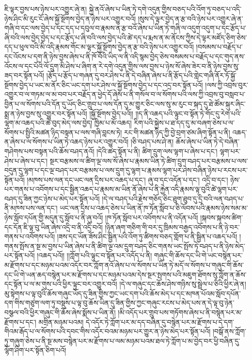 ཇི་ལྟར་བྱས་པས་ཉེས་པར་འགྱུར་ཞེ་ན། སྐྱེ་ནའོ་ཞེས་པ་ཡིན་ཏེ་དགེ་འདུན་གྱིས་བཅད་པའི་འོག་ཏུ་བཅད་པ་འདི་ཉེས་ཤིང་མི་རུང་ངོ་ཞེས་སྐྱོ་སྔོགས་བྱེད་ན་ཉེས་པར་འགྱུར་བའོ། །སུས་དེ་ལྟར་བྱེད་ན་རྩ་བའི་ཉེས་པར་འགྱུར་ཞེ་ན་གཞི་བ་དང་ལས་བྱེད་པ་དང་དད་པ་དབུལ་བ་རྣམས་ན་རྩ་བའོ་ཞེས་པ་ཡིན་ཏེ་གཞི་ལ་འདུག་འདུག་པ་དང་རྩོད་པ་ཞི་བའི་ལས་བྱེད་བྱེད་པ་དང་རྩོད་པ་ཞི་བའི་ལས་བྱེད་པའི་ཚེ་དད་པ་རྨས་ན་མ་ནོངས་ཀྱིས་དེ་ལྟར་མཛོད་ཅིག་ཅེས་དད་པ་ཕུལ་བའི་མི་འདི་རྣམས་གོང་མ་ལྟར་སྐྱོ་སྔོགས་བྱེད་ན་རྩ་བའི་ཉེས་པར་འགྱུར་བའོ། །བསམས་པ་བརྗོད་པ་དང་འོངས་པ་དག་ནི་ཉེས་བྱས་ཞེས་པ་ནི་ཁོ་བོའི་ཡིད་ལ་ནི་འདི་སྙམ་བྱེད་ཅེས་བསམས་པ་བརྗོད་པ་དང་གུད་ནས་འོངས་ལ་དང་པོའི་ལོ་དྲུག་མི་ཤེས་པ་ཞིག་ན་རེ་དགེ་འདུན་གྱིས་ལས་བྱས་པ་ཉེས་སོ་ཞེས་ཟེར་བ་ནི་ཉེས་བྱས་སུ་ཟད་བར་སྟོན་པའོ། །རྩོད་པ་རྩོད་པ་གཞན་དུ་བར་ཤེས་པ་ནི་དེ་བཞིན་ཞེས་པ་ནི་རྩོད་པའི་གླེང་གཞི་ནོར་ཏོ་སྐྱོ་སྔོགས་བྱེད་པ་ཡང་མ་ནོར་ཅིང་ཡང་དག་པར་ཤེས་ལ་སྐྱོ་སྔོགས་བྱེད་པ་དང་འདྲ་བར་སྟོན་པའོ། །ལས་ཀྱི་འབྲས་བུར་འགྱུར་བ་ལ་གཏམ་ལ་མ་བབ་པར་བརྗོད་ན་ཕྱེད་དོ་ཞེས་པ་ནི་གསོལ་བ་ལ་སོགས་པའི་ལས་ཀྱི་འབྲས་བུ་བསླབ་པ་བྱིན་པ་ལ་སོགས་པའི་དོན་དུ་ཡོད་ཅིང་གྲུབ་པ་ལས་དོན་དུ་མ་གྱུར་ཅིང་ལས་སུ་མ་རུང་བ་སྐད་དུ་ཐེ་ཚོམ་སྐུར་ཞིང་སྨྲ་ན་ཉེས་བྱས་སུ་འགྱུར་བར་སྟོན་པའོ། །སྐྱོ་སྔོགས་བྱེད་པའོ།། །།ད་ནི་འཆད་པའི་ལྟུང་བ་སྟོན་ཏེ་གོང་དུ་རེག་པའི་ལྷག་མ་འཆད་པའི་ཚེ་བུད་མེད་ལས་བྱེད། ཁྱིམ་པ་མོ་འཆད། རིག་པའི་སྐྱེས་པ་ཐ་དད་དུ་མ་བཞག་ཅེས་པ་ལ་སོགས་པ་སྤྱིའི་མཚན་ཉིད་བསྟན་པ་ལས་གཞི་བླངས་ཏེ། རང་གི་མཚན་ཉིད་ཀྱི་བྱེ་བྲག་ཙམ་ཞིག་སྟོན་པ་ནི། འཆད་ན་ཞེས་པ་ལ་སོགས་པ་ཡིན་ཏེ་འཆད་ཉེས་པར་འགྱུར་བའོ། །ཅི་བཤད་པས་ཤེ་ན། ཆོས་ཞེས་པ་ཡིན་ཏེ་དེ་བཞིན་གཤེགས་པས་བསྟན་པའི་ཆོས་བཤད་ནའོ། །དེའི་ཚད་སྟོན་པ་ནི། ཚིག་དྲུག་ལས་ལྷག་པ་ཞེས་པ་དང་། ལྷག་པར་ཤེས་པ་ཞེས་པ་དང་། སྔར་བརྩམས་ལ་ཚིག་ལྔ་ལས་སོ་ཞེས་པ་རྣམས་ཡིན་ཏེ་ཚིག་དྲུག་བཤད་པར་བརྩམས་པ་ལས་བདུན་དུ་ལྷག་པ་དང་ལྔ་བཤད་པར་བརྩམས་པ་ལས་དྲུག་དུ་ལྷག་པ་རྣམས་ལྷག་པར་ཤེས་བཞིན་ཉེས་པ་རངས་པར་སྟོན་པའོ། །མཁས་པས་ལན་དང་ཡང་ལན་དྲིས་པར་འཆད་པ་དང་། ཞུ་བ་དང་འདོན་པ་དང་། འདྲི་བ་དང་། ཉེས་པར་གནས་པ་འབོགས་པ་དང་སྦྱིན་འཆད་པ་རྣམས་མ་ཡིན་ནོ་ཞེས་པ་ནི་རྐྱེན་འདི་རྣམས་ལྟ་བུའི་ཚེ་ལྷག་པར་བཤད་དུ་ཟིན་ཀྱང་ཉེས་པ་མེད་པར་སྟོན་པའོ། །དེ་ལ་བཤད་པའི་རྗེས་གཅོད་ཅིང་ཐུག་ཐུབ་དུ་དྲི་བའི་ལན་བཤད་པ་ནི་མཁས་པས་ལན་དང་། ཡང་ལན་དྲིས་པ་འཆད་ཅེས་པ་ཡིན་ནོ་ཁ་ཏོན་སློབ་པ་ཅི་ལོབས་པའི་རྣམས་ཉེས་སམ་མ་ཉེས་སློབ་དཔོན་གྱི་མདུན་དུ་སློབ་པ་ནི་ཞུ་བའོ། །ཁ་ཏོན་སློབ་པར་འབོགས་པ་ནི་འདོན་པའོ། །སྐབས་སྐབས་ཚིག་དང་དོན་ཇི་ལྟ་བུ་ཡིན་ཞེས་འདྲི་བ་ནི་འདྲི་བའོ། །ཉིན་ཞག་གཅིག་གི་བར་དུ་ཁྲིམས་བརྒྱད་འབོགས་པ་ནི་ཉེ་བར་གནས་པ་འབོགས་པའོ། །ཟས་དང་ཡོན་ཟོས་ཤིང་སྦྱིན་པའི་འོག་ཏུ་ཚིགས་བཅད་གློག་པ་ནི་སྦྱིན་པ་འཆད་པའོ། །གནས་སྤོས་ན་སྔ་མ་བྱས་པ་ཡིན་ཞེས་པ་ནི་ཚིག་ལྔ་འམ་དྲུག་བཤད་ཅིང་གནས་ཡང་སྤོས་ཏེ་བཤད་པ་ནི་ཉེས་མེད་པར་སྟོན་པའོ། །འཆད་པའོ།། །།ཀློག་པའི་ལྟུང་བ་སྟོན་པར་འདོད་པ་ནི། གཞུང་གི་ཆོས་དང་ཡི་གེ་ཡང་བསྙེན་པར་མ་རྫོགས་པ་དང་མཉམ་པའམ་འདོར་བར་ཀློག་ནའོ་ཞེས་པ་ལ་སོགས་པ་ཡིན་ཏེ་མདོ་ལ་སོགས་པ་གཞུང་གི་ཆོས་དང་ཡི་གེ་ཡན་ཆད་བསྙེན་པར་མ་རྫོགས་པ་དང་མཉམ་པའམ་དེས་སྔར་སྤགས་པའི་མཇུག་ཐོགས་སུ་ཀློག་ན་ཆོས་དང་སྟོན་པ་ལ་མ་གུས་པའི་ཕྱིར་ལྟུང་བར་འགྱུར་བའོ། །དེ་ལ་གཞུང་དང་ཆོས་ཤེས་གཉིས་སུ་སྦྲེལ་པ་ཅིའི་ཕྱིར་ཞེ་ན། མུ་སྟེགས་པ་ལྟ་བུའི་ཆོས་གཞུང་ཡོད་དུ་ཟིན་གྱིས་ཀྱང་ཡང་དག་པའི་ཆོས་མེད་པ་དང་མཁན་པོའམ་སློབ་དཔོན་དག་གིས་གཙུག་ལག་ཏུ་བསྡུས་པ་ལྟ་བུ་ཆོས་ཡིན་དུ་ཟིན་གྱིས་ཀྱང་གཞུང་རངས་པ་མེད་པས་ན་དེ་ལྟ་བུ་ཉེན་བསྩལ་བའི་ཕྱིར་གཞུང་གི་ཆོས་ཞེས་སྨོས་པ་ཡིན་ནོ། །མི་འདོད་པར་གྲུབ་པས་གཏོགས་ཞེས་པ་ནི་བསྙེན་པར་མ་རྫོགས་པ་དང་། མགྲིན་མཉམ་པའམ། དེ་འདོར་ཏེ་ཀློག་པར་མ་དད་བཞིན་དུ་བསྙེན་པར་མ་རྫོགས་པ་དེ་དག་གིའམ་རྒོད་པ་ལ་སོགས་པའི་དབང་གིས་འདོར་བའམ་མཉམ་པར་གྱུར་ན་ཉེས་མེད་པར་སྟོན་པའོ། །བསྒོ་ནས་ཀློག་ཏུ་གཞུག་ཅེས་པ་ནི་སྔ་མས་བསྙེན་པར་མ་རྫོགས་པ་ལམ་མཉམ་པའམ་ཐལ་ཏེ་ཀློག་པ་མ་བྱེད་བར་ཕྱི་བཞིན་དུ་ལྷོག་ཤིག་པར་སྟོན་ཅིག་པའོ། 